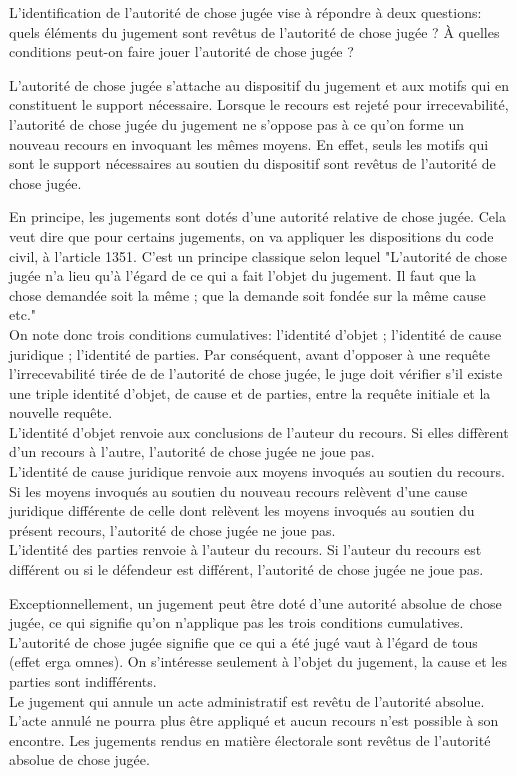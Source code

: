 \documentclass[10pt, a4paper, openany]{book}
\begin{document}
L'identification de l'autorité de chose jugée vise à répondre à deux questions: quels éléments du jugement sont revêtus de l'autorité de chose jugée ? À quelles conditions peut-on faire jouer l'autorité de chose jugée ? 


L'autorité de chose jugée s'attache au dispositif du jugement et aux motifs qui en constituent le support nécessaire. Lorsque le recours est rejeté pour irrecevabilité, l'autorité de chose jugée du jugement ne s'oppose pas à ce qu'on forme un nouveau recours en invoquant les mêmes moyens. En effet, seuls les motifs qui sont le support nécessaires au soutien du dispositif sont revêtus de l'autorité de chose jugée. 


En principe, les jugements sont dotés d'une autorité relative de chose jugée. Cela veut dire que pour certains jugements, on va appliquer les dispositions du code civil, à l'article 1351. C'est un principe classique selon lequel "L'autorité de chose jugée n'a lieu qu'à l'égard de ce qui a fait l'objet du jugement. Il faut que la chose demandée soit la même ; que la demande soit fondée sur la même cause etc." \\
On note donc trois conditions cumulatives: l'identité d'objet ; l'identité de cause juridique ; l'identité de parties. Par conséquent, avant d'opposer à une requête l'irrecevabilité tirée de de l'autorité de chose jugée, le juge doit vérifier s'il existe une triple identité d'objet, de cause et de parties, entre la requête initiale et la nouvelle requête. \\
L'identité d'objet renvoie aux conclusions de l'auteur du recours. Si elles diffèrent d'un recours à l'autre, l'autorité de chose jugée ne joue pas. \\
L'identité de cause juridique renvoie aux moyens invoqués au soutien du recours. Si les moyens invoqués au soutien du nouveau recours relèvent d'une cause juridique différente de celle dont relèvent les moyens invoqués au soutien du présent recours, l'autorité de chose jugée ne joue pas. \\
L'identité des parties renvoie à l'auteur du recours. Si l'auteur du recours est différent ou si le défendeur est différent, l'autorité de chose jugée ne joue pas. 


Exceptionnellement, un jugement peut être doté d'une autorité absolue de chose jugée, ce qui signifie qu'on n'applique pas les trois conditions cumulatives. \\
L'autorité de chose jugée signifie que ce qui a été jugé vaut à l'égard de tous (effet erga omnes). On s'intéresse seulement à l'objet du jugement, la cause et les parties sont indifférents. \\
Le jugement qui annule un acte administratif est revêtu de l'autorité absolue. L'acte annulé ne pourra plus être appliqué et aucun recours n'est possible à son encontre. Les jugements rendus en matière électorale sont revêtus de l'autorité absolue de chose jugée. 
\end{document}
